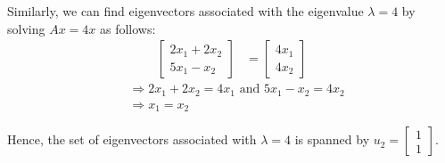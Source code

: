\begin{example}
Similarly, we can find eigenvectors associated with the eigenvalue \( \lambda = 4 \) by solving \( Ax = 4x \) as follows:
\[
\begin{aligned}
    \begin{bmatrix} 2x_1 + 2x_2 \\ 5x_1 - x_2 \end{bmatrix} &= \begin{bmatrix} 4x_1 \\ 4x_2 \end{bmatrix} 
\end{aligned}
\]
\[
\begin{aligned}
    &\Rightarrow 2x_1 + 2x_2 = 4x_1 \text{ and } 5x_1 - x_2 = 4x_2 \\
    &\Rightarrow x_1 = x_2
\end{aligned}
\]

Hence, the set of eigenvectors associated with \( \lambda = 4 \) is spanned by \( u_2 = \begin{bmatrix} 1 \\ 1 \end{bmatrix} \).
\end{example}



